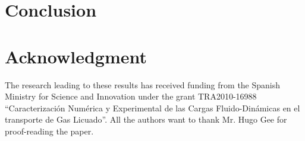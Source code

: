 \documentclass[a4paper,conference]{IEEEtran}
\begin{document}
\section{Conclusion}



\section*{Acknowledgment}
The research  leading  to these results has received funding from the Spanish Ministry for Science and
 Innovation under the grant TRA2010-16988
``Caracterizaci\'on Num\'erica y Experimental de las Cargas Fluido-Din\'amicas en el transporte de Gas Licuado''.
All the authors want to thank Mr. Hugo Gee for proof-reading the paper.



\end{document}
